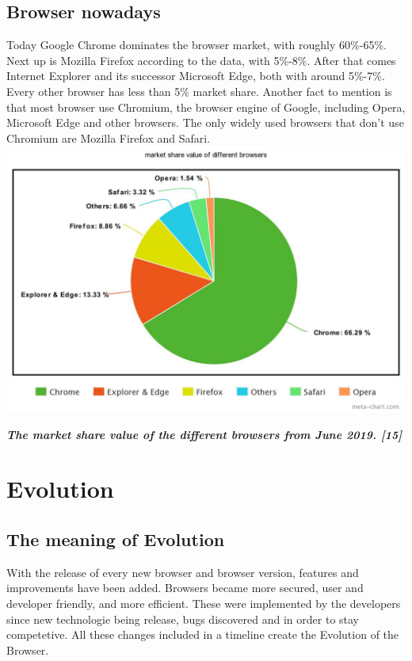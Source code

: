 \documentclass[runningheads]{llncs}
\begin{document}
		\subsection{Browser nowadays}
		Today Google Chrome dominates the browser market, with roughly 60\%-65\%. Next up is Mozilla Firefox according to the data, with 5\%-8\%. After that comes  Internet Explorer and its successor Microsoft Edge, both with around 5\%-7\%. Every other browser has less than 5\% market share. Another fact to mention is that most browser use Chromium, the browser engine of Google, including Opera, Microsoft Edge and other browsers. The only widely used browsers that don't use Chromium are Mozilla Firefox and Safari.\\
		\includegraphics[scale=0.3]{meta-chart.jpeg}\\
		\begin{center}
			\textit{\textbf{The market share value of the different browsers from June 2019. [15]}}
		\end{center}

	\section{Evolution}
		\subsection{The meaning of Evolution}
		With the release of every new browser and browser version, features and improvements have been added. Browsers became more secured, user and developer friendly, and more efficient. These were implemented by the developers since new technologie being release, bugs discovered and in order to stay competetive. All these changes included in a timeline create the Evolution of the Browser.
\end{document}
